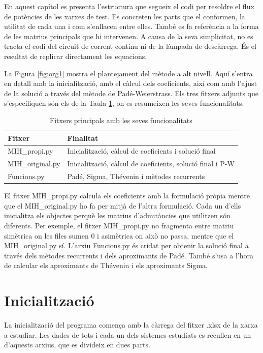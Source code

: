 En aquest capítol es presenta l'estructura que segueix el codi per resoldre el flux de potències de les xarxes de test. Es concreten les parts que el conformen, la utilitat de cada una i com s'enllacen entre elles. També es fa referència a la forma de les matrius principals que hi intervenen. A causa de la seva simplicitat, no es tracta el codi del circuit de corrent continu ni de la làmpada de descàrrega. És el resultat de replicar directament les equacions.

La Figura \ref{fig:org1} mostra el plantejament del mètode a alt nivell. Aquí s'entra en detall amb la inicialització, amb el càlcul dels coeficients, així com amb l'ajust de la solució a través del mètode de Padé-Weierstrass. Els tres fitxers adjunts que s'especifiquen són els de la Taula \ref{tab:Fitxers}, on es resumeixen les seves funcionalitats.

\begin{table}[!htb]
    \begin{center}
    \begin{tabular}{ll}
    \hline
    Fitxer & Finalitat\\
    \hline
    \hline
    MIH\_propi.py & Inicialització, càlcul de coeficients i solució final\\
    MIH\_original.py & Inicialització, càlcul de coeficients, solució final i P-W\\
    Funcions.py & Padé, Sigma, Thévenin i mètodes recurrents\\
    \hline 
    \end{tabular}
    \caption{Fitxers principals amb les seves funcionalitats}
    \label{tab:Fitxers}
    \end{center}
  \end{table}

El fitxer MIH\_propi.py calcula els coeficients amb la formulació pròpia mentre que el MIH\_original.py ho fa per mitjà de l'altra formulació. Cada un d'ells inicialitza els objectes perquè les matrius d'admitàncies que utilitzen són diferents. Per exemple, el fitxer MIH\_propi.py no fragmenta entre matriu simètrica on les files sumen 0 i asimètrica on això no passa, mentre que el MIH\_original.py sí. L'arxiu Funcions.py és cridat per obtenir la solució final a través dels mètodes recurrents i dels aproximants de Padé. També s'usa a l'hora de calcular els aproximants de Thévenin i els aproximants Sigma.

\section{Inicialització}
La inicialització del programa comença amb la càrrega del fitxer .xlsx de la xarxa a estudiar. Les dades de tots i cada un dels sistemes estudiats es recullen en un d'aquests arxius, que es divideix en dues parts. 

